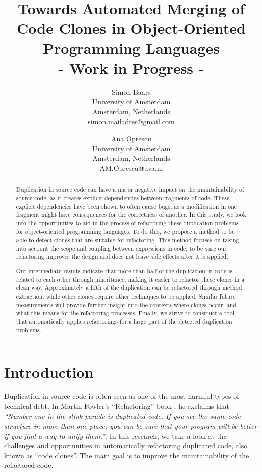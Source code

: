 \documentclass[a4paper]{article}
\title{Towards Automated Merging of Code Clones in Object-Oriented Programming Languages\\- Work in Progress -}
\author{
Simon Baars \\ University of Amsterdam\\
                Amsterdam, Netherlands \\ simon.mailadres@gmail.com
\and
Ana Oprescu \\ University of Amsterdam\\
                Amsterdam, Netherlands \\
                AM.Oprescu@uva.nl
}
\begin{document}
\maketitle

\begin{abstract}
Duplication in source code can have a major negative impact on the maintainability of source code, as it creates explicit dependencies between fragments of code. These explicit dependencies have been shown to often cause bugs, as a modification in one fragment might have consequences for the correctness of another. In this study, we look into the opportunities to aid in the process of refactoring these duplication problems for object-oriented programming languages. To do this, we propose a method to be able to detect clones that are suitable for refactoring. This method focuses on taking into account the scope and coupling between expressions in code, to be sure our refactoring improves the design and does not leave side effects after it is applied.

Our intermediate results indicate that more than half of the duplication in code is related to each other through inheritance, making it easier to refactor these clones in a clean way. Approximately a fifth of the duplication can be refactored through method extraction, while other clones require other techniques to be applied. Similar future measurements will provide further insight into the contexts where clones occur, and what this means for the refactoring processes. Finally, we strive to construct a tool that automatically applies refactorings for a large part of the detected duplication problems.
\end{abstract}

\section{Introduction}
Duplication in source code is often seen as one of the most harmful types of technical debt. In Martin Fowler's ``Refactoring'' book \cite{fowler1999refactoring}, he exclaims that \textit{``Number one in the stink parade is duplicated code. If you see the same code structure in more than one place, you can be sure that your program will be better if you find a way to unify them.''}. In this research, we take a look at the challenges and opportunities in automatically refactoring duplicated code, also known as ``code clones''. The main goal is to improve the maintainability of the refactored code.
\end{document}
